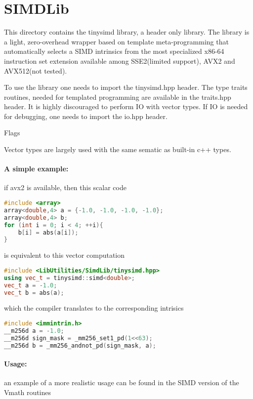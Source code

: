 %
\section{SIMDLib}

This directory contains the tinysimd library, a header only library. The library is a light, zero-overhead wrapper based on template meta-programming that automatically selects a SIMD intrinsics from the most specialized x86-64 instruction set extension available among SSE2(limited support), AVX2 and AVX512(not tested).

To use the library one needs to import the tinysimd.hpp header.
The type traits routines, needed for templated programming are available in the traits.hpp header.
It is highly discouraged to perform IO with vector types. If IO is needed for debugging, one needs to import the io.hpp header.

Flags


Vector types are largely used with the same sematic as built-in c++ types.

\paragraph{A simple example: } if avx2 is available, then this scalar code
\begin{lstlisting}[language=C++]
#include <array>
array<double,4> a = {-1.0, -1.0, -1.0, -1.0};
array<double,4> b;
for (int i = 0; i < 4; ++i){
    b[i] = abs(a[i]);
}
\end{lstlisting}

is equivalent to this vector computation

\begin{lstlisting}[language=C++]
#include <LibUtilities/SimdLib/tinysimd.hpp>
using vec_t = tinysimd::simd<double>;
vec_t a = -1.0;
vec_t b = abs(a);
\end{lstlisting}

which the compiler translates to the corresponding intrisics

\begin{lstlisting}[language=C++]
#include <immintrin.h>
__m256d a = -1.0;
__m256d sign_mask = _mm256_set1_pd(1<<63);
__m256d b = _mm256_andnot_pd(sign_mask, a);
\end{lstlisting}

\paragraph{Usage: } an example of a more realistic usage can be found in the SIMD version of the Vmath routines

